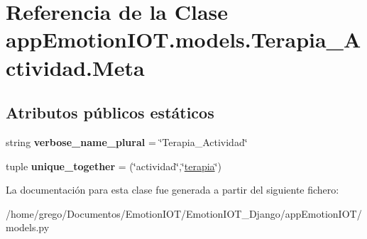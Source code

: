 \hypertarget{classappEmotionIOT_1_1models_1_1Terapia__Actividad_1_1Meta}{}\section{Referencia de la Clase app\+Emotion\+I\+O\+T.\+models.\+Terapia\+\_\+\+Actividad.\+Meta}
\label{classappEmotionIOT_1_1models_1_1Terapia__Actividad_1_1Meta}
\subsection*{Atributos públicos estáticos}
\begin{DoxyCompactItemize}
\item 
string {\bfseries verbose\+\_\+name\+\_\+plural} = \char`\"{}Terapia\+\_\+\+Actividad\char`\"{}\hypertarget{classappEmotionIOT_1_1models_1_1Terapia__Actividad_1_1Meta_ac3f79415d09f3d68362a7b3f1ea8013b}{}\label{classappEmotionIOT_1_1models_1_1Terapia__Actividad_1_1Meta_ac3f79415d09f3d68362a7b3f1ea8013b}

\item 
tuple {\bfseries unique\+\_\+together} = (\char`\"{}actividad\char`\"{},\char`\"{}\hyperlink{classappEmotionIOT_1_1models_1_1Terapia__Actividad_ad2740902265727cf1592f5ae2f1c6260}{terapia}\char`\"{})\hypertarget{classappEmotionIOT_1_1models_1_1Terapia__Actividad_1_1Meta_a1c481db8618c5b598e99aac5630f8a5f}{}\label{classappEmotionIOT_1_1models_1_1Terapia__Actividad_1_1Meta_a1c481db8618c5b598e99aac5630f8a5f}

\end{DoxyCompactItemize}


La documentación para esta clase fue generada a partir del siguiente fichero\+:\begin{DoxyCompactItemize}
\item 
/home/grego/\+Documentos/\+Emotion\+I\+O\+T/\+Emotion\+I\+O\+T\+\_\+\+Django/app\+Emotion\+I\+O\+T/models.\+py\end{DoxyCompactItemize}
